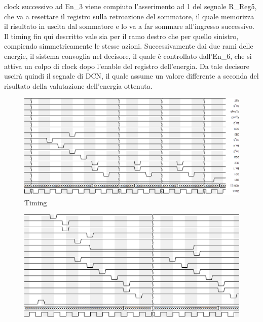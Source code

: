 \documentclass[a4paper, titlepage]{article}
\begin{document}
clock successivo ad En\_3 viene compiuto l'asserimento ad 1 del segnale R\_Reg5, che va a resettare il registro sulla retroazione del sommatore, il quale memorizza il risultato in uscita dal sommatore e lo va a far sommare all'ingresso successivo.\\Il timing fin qui descritto vale sia per il ramo destro che per quello sinistro, compiendo simmetricamente le stesse azioni.
Successivamente dai due rami delle energie, il sistema convoglia nel decisore, il quale è controllato dall'En\_6, che si attiva un colpo di clock dopo l'enable del registro dell'energia. Da tale decisore uscirà quindi il segnale di DCN, il quale assume un valore differente a seconda del risultato della valutazione dell'energia ottenuta.

\begin{figure}
\centering
\includegraphics[scale=0.7]{timingmicV3_1.png} 
\caption{Timing}
\label{TX Timing}
\end{figure}
\begin{figure}
\centering
\includegraphics[scale=0.7]{timingmicV3_2.png} 
\end{figure}
\newpage
\end{document}
